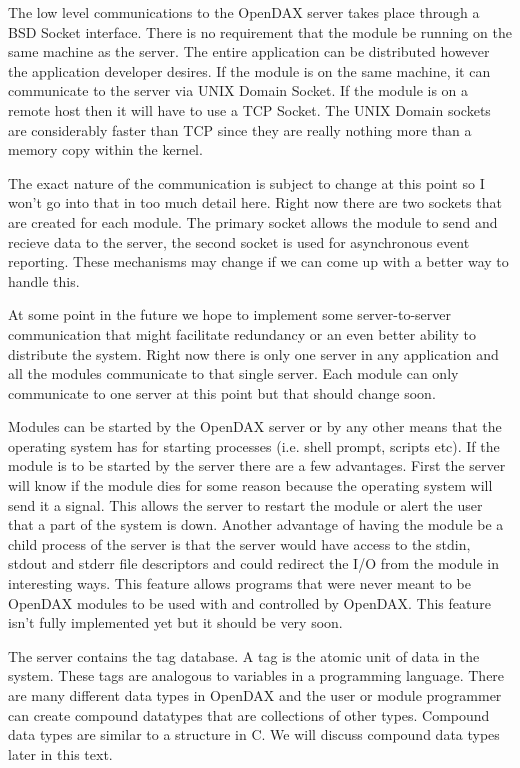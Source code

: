 \documentclass[10pt,letterpaper]{report}
\begin{document}
The low level communications to the OpenDAX server takes place through a BSD Socket interface.  There is no requirement that the module be running on the same machine as the server.  The entire application can be distributed however the application developer desires.  If the module is on the same machine, it can communicate to the server via UNIX Domain Socket.  If the module is on a remote host then it will have to use a TCP Socket.  The UNIX Domain sockets are considerably faster than TCP since they are really nothing more than a memory copy within the kernel.

The exact nature of the communication is subject to change at this point so I won't go into that in too much detail here.  Right now there are two sockets that are created for each module.  The primary socket allows the module to send and recieve data to the server, the second socket is used for asynchronous event reporting.  These mechanisms may change if we can come up with a better way to handle this.

At some point in the future we hope to implement some server-to-server communication that might facilitate redundancy or an even better ability to distribute the system.  Right now there is only one server in any application and all the modules communicate to that single server.  Each module can only communicate to one server at this point but that should change soon.

Modules can be started by the OpenDAX server or by any other means that the operating system has for starting processes (i.e. shell prompt, scripts etc).  If the module is to be started by the server there are a few advantages.  First the server will know if the module dies for some reason because the operating system will send it a signal.  This allows the server to restart the module or alert the user that a part of the system is down.  Another advantage of having the module be a child process of the server is that the server would have access to the stdin, stdout and stderr file descriptors and could redirect the I/O from the module in interesting ways.  This feature allows programs that were never meant to be OpenDAX modules to be used with and controlled by OpenDAX.  This feature isn't fully implemented yet but it should be very soon.

The server contains the tag database.  A tag is the atomic unit of data in the system.  These tags are analogous to variables in a programming language.  There are many different data types in OpenDAX and the user or module programmer can create compound datatypes that are collections of other types.  Compound data types are similar to a structure in C.  We will discuss compound data types later in this text.
\end{document}
